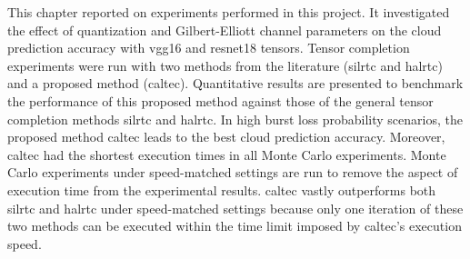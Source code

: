This chapter reported on experiments performed in this project. It investigated the effect of quantization and Gilbert-Elliott channel parameters on the cloud prediction accuracy with \gls{vgg16} and \gls{resnet18} tensors. Tensor completion experiments were run with two methods from the literature (\gls{silrtc} and \gls{halrtc}) and a proposed method (\gls{caltec}). Quantitative results are presented to benchmark the performance of this proposed method against those of the general tensor completion methods \gls{silrtc} and \gls{halrtc}. In high burst loss probability scenarios, the proposed method \gls{caltec} leads to the best cloud prediction accuracy. Moreover, \gls{caltec} had the shortest execution times in all Monte Carlo experiments. Monte Carlo experiments under speed-matched settings are run to remove the aspect of execution time from the experimental results. \gls{caltec} vastly outperforms both \gls{silrtc} and \gls{halrtc} under speed-matched settings because only one iteration of these two methods can be executed within the time limit imposed by \gls{caltec}'s execution speed.
